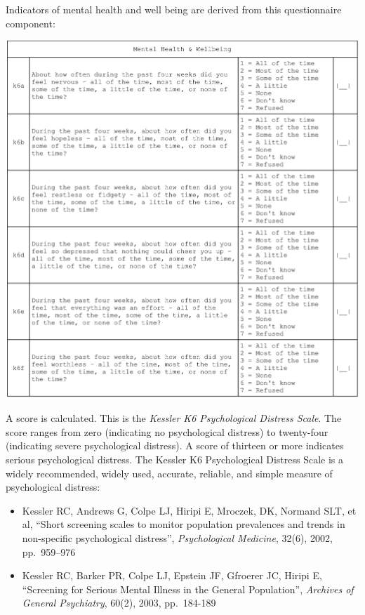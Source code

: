 \documentclass[12pt,a4paper]{book}
\theoremstyle{definition}
\theoremstyle{definition}
\theoremstyle{definition}
\theoremstyle{remark}
\begin{document}
Indicators of mental health and well being are derived from this
questionnaire component:

\begin{center}\includegraphics{figures/questionnaire06} \end{center}

A score is calculated. This is the \emph{Kessler K6 Psychological
Distress Scale}. The score ranges from zero (indicating no psychological
distress) to twenty-four (indicating severe psychological distress). A
score of thirteen or more indicates serious psychological distress. The
Kessler K6 Psychological Distress Scale is a widely recommended, widely
used, accurate, reliable, and simple measure of psychological distress:

\begin{itemize}
\item
  Kessler RC, Andrews G, Colpe LJ, Hiripi E, Mroczek, DK, Normand SLT,
  et al, ``Short screening scales to monitor population prevalences and
  trends in non-specific psychological distress'', \emph{Psychological
  Medicine}, 32(6), 2002, pp.~959--976
\item
  Kessler RC, Barker PR, Colpe LJ, Epstein JF, Gfroerer JC, Hiripi E,
  ``Screening for Serious Mental Illness in the General Population'',
  \emph{Archives of General Psychiatry}, 60(2), 2003, pp.~184-189
\end{itemize}
\end{document}
